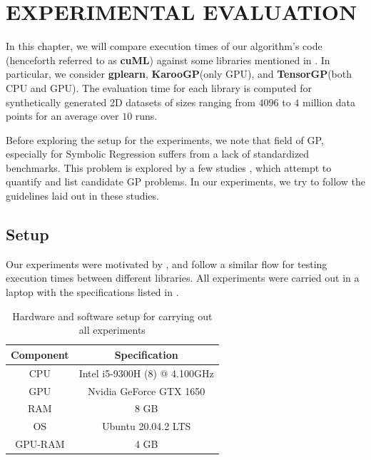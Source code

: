 \chapter{EXPERIMENTAL EVALUATION}
\label{chap:experiments}

In this chapter, we will compare execution times of our algorithm's code (henceforth referred to as \textbf{cuML}) against some libraries mentioned in .
In particular, we consider \textbf{gplearn}\citep{gplearn}, \textbf{KarooGP}\citep{staats2017tensorflow}(only GPU), and \textbf{TensorGP}\citep{baeta2021tensorgp}(both CPU and GPU). 
The evaluation time for each library is computed for synthetically generated 2D datasets of sizes ranging from $4096$ to $4$ million data points for an average over $10$ runs. 

Before exploring the setup for the experiments, we note that field of GP, especially for Symbolic Regression suffers from a lack of standardized benchmarks. This problem is explored by a few studies \citep{GP_Better_Benchmarks}\citep{Orzechowski_2018}, which attempt to quantify and list candidate GP problems. In our experiments, we try to follow the guidelines laid out in these studies.

\section{Setup}
\label{sec:setup}
Our experiments were motivated by \citet{baeta2021speed}, and follow a similar flow for testing execution times between different libraries. All experiments were carried out in a laptop with the specifications listed in .

\begin{table}[htbp]
  \caption{Hardware and software setup for carrying out all experiments}
  \begin{center}
      \begin{tabular}[c]{cc}%
        \toprule
        \textbf{Component} &   \textbf{Specification} \\
        \midrule
        CPU & Intel i5-9300H (8) @ 4.100GHz \\
        GPU & Nvidia GeForce GTX 1650       \\
        RAM & 8 GB                          \\
        OS  & Ubuntu 20.04.2 LTS            \\
        GPU-RAM& 4 GB          \\
        \bottomrule
      \end{tabular}
      \label{tab:laptop}
  \end{center}
\end{table}

